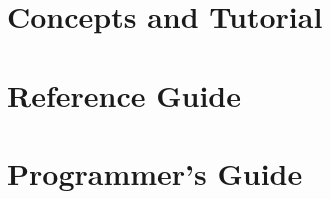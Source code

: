 \documentclass{book}
\begin{document}


{
\setlength{\parskip}{\dPar}
\setlength{\parindent}{0ex}


}

\tableofcontents
\listoffigures

\setlength{\parskip}{\dPar}
\setlength{\parindent}{0ex}

\part{Concepts and Tutorial}




\part{Reference Guide}\label{ref_guide}







\part{Programmer's Guide}







\printindex
\end{document}
